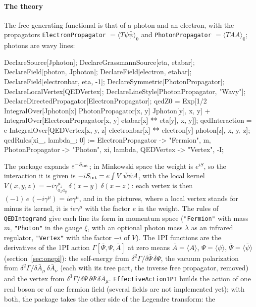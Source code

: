 \documentclass[11pt,a4paper]{article}
\newcommand{\pkg}[1]{\texttt{#1}}
\begin{document}
\paragraph{The theory} The free generating functional is that of a photon and an electron, with the propagators
\pkg{ElectronPropagator} $=\langle T\psi\bar\psi\rangle_0$ and \pkg{PhotonPropagator} $=\langle TAA\rangle_0$; photons are wavy
lines:
\begin{code}
DeclareSource[Jphoton]; DeclareGrassmannSource[eta, etabar];
DeclareField[photon, Jphoton]; DeclareField[electron, etabar];
DeclareField[electronbar, eta, -1];
DeclareSymmetric[PhotonPropagator]; DeclareLocalVertex[QEDVertex];
DeclareLineStyle[PhotonPropagator, "Wavy"];
DeclareDirectedPropagator[ElectronPropagator];
qedZ0 = Exp[1/2 IntegralOver[Jphoton[x] PhotonPropagator[x, y] Jphoton[y], {x, y}] +
    IntegralOver[ElectronPropagator[x, y] etabar[x] ** eta[y], {x, y}]];
qedInteraction = e IntegralOver[QEDVertex[x, y, z] electronbar[x] ** electron[y]
    photon[z], {x, y, z}];
qedRules[xi_, lambda_: 0] := {ElectronPropagator -> {"Fermion", m},
    PhotonPropagator -> {"Photon", {xi, lambda}}, QEDVertex -> {"Vertex", -I}};
\end{code}
The package expands $e^{-S_{\rm int}}$; in Minkowski space the weight is $e^{iS}$, so the interaction it is given is
$-iS_{\rm int}=e\int V\,\bar\psi\psi A$, with the local kernel $V(x,y,z)=-i\gamma^{\mu_z}_{a_xa_y}\,\delta(x-y)\,\delta(x-z)$:
each vertex is then $(-1)\,e\,(-i\gamma^\mu)=ie\gamma^\mu$, and in the pictures, where a local vertex stands for minus its
kernel, it is $ie\gamma^\mu$ with the factor $e$ in the weight. The rules of \pkg{QEDIntegrand} give each line its form in
momentum space (\pkg{"Fermion"} with mass $m$, \pkg{"Photon"} in the gauge $\xi$, with an optional photon mass $\lambda$ as
an infrared regulator, \pkg{"Vertex"} with the factor $-i$ of $V$). The 1PI functions are the derivatives of the 1PI
action $\Gamma[\bar\Psi,\Psi,\bar A]$ at zero means $\bar A=\langle A\rangle$, $\Psi=\langle\psi\rangle$, $\bar\Psi=\langle\bar\psi\rangle$ (section~\ref{sec:onepi}): the self-energy from $\delta^2\Gamma/\delta\bar\Psi\,\delta\Psi$,
the vacuum polarization from $\delta^2\Gamma/\delta\bar A_\mu\,\delta\bar A_\nu$ (each with its tree part, the inverse free propagator,
removed) and the vertex from $\delta^3\Gamma/\delta\bar\Psi\,\delta\Psi\,\delta\bar A_\mu$. \pkg{EffectiveAction1PI} builds the action of one
real boson or of one fermion field (several fields are not implemented yet); with both, the package takes the other side of the Legendre transform: the
\end{document}
